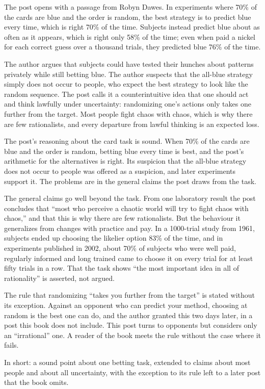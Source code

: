 \begin{afterword}
\summaryhead

The post opens with a passage from Robyn Dawes. In experiments where 70\% of the cards are blue and the order is random, the best strategy is to predict blue every time, which is right 70\% of the time. Subjects instead predict blue about as often as it appears, which is right only 58\% of the time; even when paid a nickel for each correct guess over a thousand trials, they predicted blue 76\% of the time.

The author argues that subjects could have tested their hunches about patterns privately while still betting blue. The author suspects that the all-blue strategy simply does not occur to people, who expect the best strategy to look like the random sequence. The post calls it a counterintuitive idea that one should act and think lawfully under uncertainty: randomizing one's actions only takes one further from the target. Most people fight chaos with chaos, which is why there are few rationalists, and every departure from lawful thinking is an expected loss.

\responsehead

The post's reasoning about the card task is sound. When 70\% of the cards are blue and the order is random, betting blue every time is best, and the post's arithmetic for the alternatives is right. Its suspicion that the all-blue strategy does not occur to people was offered as a suspicion, and later experiments support it. The problems are in the general claims the post draws from the task.

The general claims go well beyond the task. From one laboratory result the post concludes that ``most who perceive a chaotic world will try to fight chaos with chaos,'' and that this is why there are few rationalists. But the behaviour it generalizes from changes with practice and pay. In a 1000-trial study from 1961, subjects ended up choosing the likelier option 83\% of the time, and in experiments published in 2002, about 70\% of subjects who were well paid, regularly informed and long trained came to choose it on every trial for at least fifty trials in a row. That the task shows ``the most important idea in all of rationality'' is asserted, not argued.

The rule that randomizing ``takes you further from the target'' is stated without its exception. Against an opponent who can predict your method, choosing at random is the best one can do, and the author granted this two days later, in a post this book does not include. This post turns to opponents but considers only an ``irrational'' one. A reader of the book meets the rule without the case where it fails.

In short: a sound point about one betting task, extended to claims about most people and about all uncertainty, with the exception to its rule left to a later post that the book omits.
\end{afterword}
